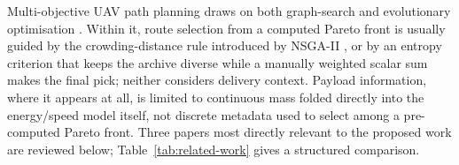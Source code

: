 \documentclass{ssnreview}
\newcommand{\flowchapter}[1]{\par\addvspace{30pt}{\let\clearpage\relax\chapter{#1}}}
\begin{document}
\flowchapter{Related Work}\label{cha:relatedwork}

Multi-objective UAV path planning draws on both graph-search and evolutionary
optimisation \cite{r11}. Within it, route selection from a computed Pareto
front is usually guided by the crowding-distance rule introduced by NSGA-II \cite{r8},
or by an entropy criterion that keeps the archive diverse while a manually weighted
scalar sum makes the final pick; neither considers delivery context. Payload
information, where it appears at all, is limited to continuous mass folded directly into
the energy/speed model itself, not discrete metadata used to select among a pre-computed
Pareto front. Three papers most directly
relevant to the proposed work are reviewed below; Table~\ref{tab:related-work} gives a
structured comparison.
\end{document}
